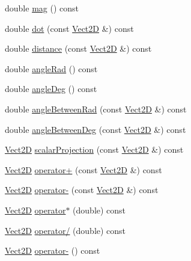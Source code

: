 \begin{DoxyCompactItemize}
\item 
double \hyperlink{classVect2D_af4bc907b1b4fbb628ddd126ac82cc49f_af4bc907b1b4fbb628ddd126ac82cc49f}{mag} () const
\item 
double \hyperlink{classVect2D_a059c879cc608a079caf62658693d4a11_a059c879cc608a079caf62658693d4a11}{dot} (const \hyperlink{classVect2D}{Vect2D} \&) const
\item 
double \hyperlink{classVect2D_a8aadc1aa9001b599513a3cddc3da4fec_a8aadc1aa9001b599513a3cddc3da4fec}{distance} (const \hyperlink{classVect2D}{Vect2D} \&) const
\item 
double \hyperlink{classVect2D_ab1be9b2af5abce11bc0cbb73a76aeaa5_ab1be9b2af5abce11bc0cbb73a76aeaa5}{angle\+Rad} () const
\item 
double \hyperlink{classVect2D_a13ca3566f8ff594598bba9e08fcbc88c_a13ca3566f8ff594598bba9e08fcbc88c}{angle\+Deg} () const
\item 
double \hyperlink{classVect2D_ac8a3f1678a112188aefec21320a66b49_ac8a3f1678a112188aefec21320a66b49}{angle\+Between\+Rad} (const \hyperlink{classVect2D}{Vect2D} \&) const
\item 
double \hyperlink{classVect2D_adb36bba502eb3e28e01fea196c2a2387_adb36bba502eb3e28e01fea196c2a2387}{angle\+Between\+Deg} (const \hyperlink{classVect2D}{Vect2D} \&) const
\item 
\hyperlink{classVect2D}{Vect2D} \hyperlink{classVect2D_a1774995c73b39f2cccd5a2307a52e1bd_a1774995c73b39f2cccd5a2307a52e1bd}{scalar\+Projection} (const \hyperlink{classVect2D}{Vect2D} \&) const
\item 
\hyperlink{classVect2D}{Vect2D} \hyperlink{classVect2D_a85276732f66c0ffe964eb3e3b5795a73_a85276732f66c0ffe964eb3e3b5795a73}{operator+} (const \hyperlink{classVect2D}{Vect2D} \&) const
\item 
\hyperlink{classVect2D}{Vect2D} \hyperlink{classVect2D_ab66937f68aab4d05cabb491e532b5359_ab66937f68aab4d05cabb491e532b5359}{operator-\/} (const \hyperlink{classVect2D}{Vect2D} \&) const
\item 
\hyperlink{classVect2D}{Vect2D} \hyperlink{classVect2D_a8813ae819872f90d908968760b2c6730_a8813ae819872f90d908968760b2c6730}{operator$\ast$} (double) const
\item 
\hyperlink{classVect2D}{Vect2D} \hyperlink{classVect2D_a208f651c84afb4e7b655eb8f964efe23_a208f651c84afb4e7b655eb8f964efe23}{operator/} (double) const
\item 
\hyperlink{classVect2D}{Vect2D} \hyperlink{classVect2D_a043d37b85822f15af552c2c08b2436fa_a043d37b85822f15af552c2c08b2436fa}{operator-\/} () const

\end{DoxyCompactItemize}
